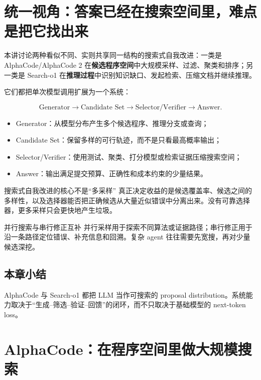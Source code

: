 \documentclass[a4paper]{article}
\begin{document}
\makelecturetitle

\section{统一视角：答案已经在搜索空间里，难点是把它找出来}

本讲讨论两种看似不同、实则共享同一结构的搜索式自我改进：一类是 AlphaCode/AlphaCode 2 在\textbf{候选程序空间}中大规模采样、过滤、聚类和排序；另一类是 Search-o1 在\textbf{推理过程}中识别知识缺口、发起检索、压缩文档并继续推理。

它们都把单次模型调用扩展为一个系统：

$$
\text{Generator}\rightarrow \text{Candidate Set}\rightarrow
\text{Selector/Verifier}\rightarrow \text{Answer}.
$$

\begin{itemize}
    \item Generator：从模型分布产生多个候选程序、推理分支或查询；
    \item Candidate Set：保留多样的可行轨迹，而不是只看最高概率输出；
    \item Selector/Verifier：使用测试、聚类、打分模型或检索证据压缩搜索空间；
    \item Answer：输出满足提交预算、正确性和成本约束的少量结果。
\end{itemize}

\begin{importantbox}{搜索式自我改进的核心不是“多采样”}
真正决定收益的是候选覆盖率、候选之间的多样性，以及选择器能否把正确候选从大量近似错误中分离出来。没有可靠选择器，更多采样只会更快地产生垃圾。
\end{importantbox}

\begin{knowledgebox}{并行搜索与串行修正互补}
并行采样用于探索不同算法或证据路径；串行修正用于沿一条路径定位错误、补充信息和回溯。复杂 agent 往往需要先宽搜，再对少量候选深挖。
\end{knowledgebox}

\subsection{本章小结}

AlphaCode 与 Search-o1 都把 LLM 当作可搜索的 proposal distribution。系统能力取决于“生成--筛选--验证--回馈”的闭环，而不只取决于基础模型的 next-token loss。

\section{AlphaCode：在程序空间里做大规模搜索}
\end{document}
